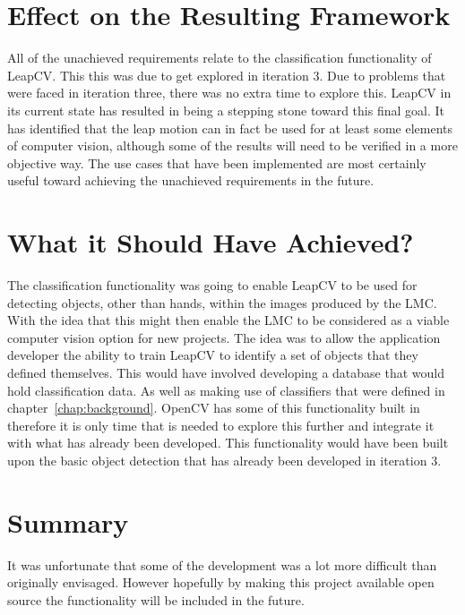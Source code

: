 \documentclass[11pt,oneside]{report}
\begin{document}
		\section{Effect on the Resulting Framework}
			All of the unachieved requirements relate to the classification functionality of LeapCV.
			This this was due to get explored in iteration 3.
			Due to problems that were faced in iteration three, there was no extra time to explore this.
			LeapCV in its current state has resulted in being a stepping stone toward this final goal.
			It has identified that the leap motion can in fact be used for at least some elements of computer vision, although some of the results will need to be verified in a more objective way.
			The use cases that have been implemented are most certainly useful toward achieving the unachieved requirements in the future.
			
		\section{What it Should Have Achieved?}
			The classification functionality was going to enable LeapCV to be used for detecting objects, other than hands, within the images produced by the LMC.
			With the idea that this might then enable the LMC to be considered as a viable computer vision option for new projects.
			The idea was to allow the application developer the ability to train LeapCV to identify a set of objects that they defined themselves. This would have involved developing a database that would hold classification data.
			As well as making use of classifiers that were defined in chapter~\ref{chap:background}.
			OpenCV has some of this functionality built in therefore it is only time that is needed to explore this further and integrate it with what has already been developed.
			This functionality would have been built upon the basic object detection that has already been developed in iteration 3.
		
		\section{Summary}
			It was unfortunate that some of the development was a lot more difficult than originally envisaged.
			However hopefully by making this project available open source the functionality will be included in the future.
		

	
\end{document}
